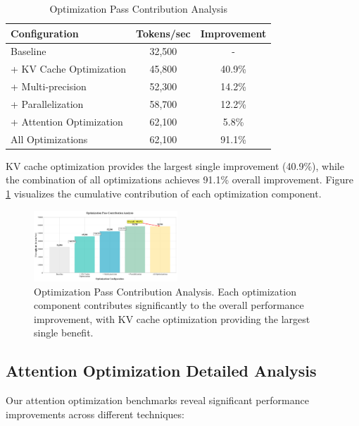 \documentclass[conference]{IEEEtran}
\begin{document}
\begin{table}[htbp]
\caption{Optimization Pass Contribution Analysis}
\begin{center}
\begin{tabular}{|l|c|c|}
\hline
\textbf{Configuration} & \textbf{Tokens/sec} & \textbf{Improvement} \\
\hline
Baseline & 32,500 & - \\
\hline
+ KV Cache Optimization & 45,800 & 40.9\% \\
\hline
+ Multi-precision & 52,300 & 14.2\% \\
\hline
+ Parallelization & 58,700 & 12.2\% \\
\hline
+ Attention Optimization & 62,100 & 5.8\% \\
\hline
All Optimizations & 62,100 & 91.1\% \\
\hline
\end{tabular}
\label{tab:ablation}
\end{center}
\end{table}

KV cache optimization provides the largest single improvement (40.9\%), while the combination of all optimizations achieves 91.1\% overall improvement. Figure \ref{fig:ablation} visualizes the cumulative contribution of each optimization component.

\begin{figure}[htbp]
\centering
\includegraphics[width=0.48\textwidth]{figures/ablation_study.pdf}
\caption{Optimization Pass Contribution Analysis. Each optimization component contributes significantly to the overall performance improvement, with KV cache optimization providing the largest single benefit.}
\label{fig:ablation}
\end{figure}

\subsection{Attention Optimization Detailed Analysis}

Our attention optimization benchmarks reveal significant performance improvements across different techniques:
\end{document}

